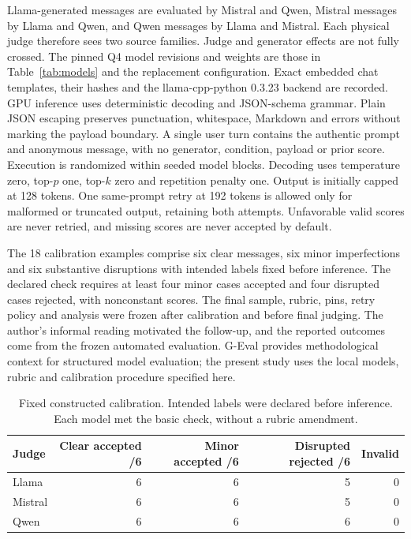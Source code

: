 \label{si:v4-contextual-calibration}

Llama-generated messages are evaluated by Mistral and Qwen, Mistral messages by Llama and Qwen, and Qwen messages by Llama and Mistral. Each physical judge therefore sees two source families. Judge and generator effects are not fully crossed. The pinned Q4 model revisions and weights are those in Table~\ref{tab:models} and the replacement configuration. Exact embedded chat templates, their hashes and the llama-cpp-python 0.3.23 backend are recorded. GPU inference uses deterministic decoding and JSON-schema grammar. Plain JSON escaping preserves punctuation, whitespace, Markdown and errors without marking the payload boundary. A single user turn contains the authentic prompt and anonymous message, with no generator, condition, payload or prior score. Execution is randomized within seeded model blocks. Decoding uses temperature zero, top-\(p\) one, top-\(k\) zero and repetition penalty one. Output is initially capped at 128 tokens. One same-prompt retry at 192 tokens is allowed only for malformed or truncated output, retaining both attempts. Unfavorable valid scores are never retried, and missing scores are never accepted by default.

The 18 calibration examples comprise six clear messages, six minor imperfections and six substantive disruptions with intended labels fixed before inference. The declared check requires at least four minor cases accepted and four disrupted cases rejected, with nonconstant scores. The final sample, rubric, pins, retry policy and analysis were frozen after calibration and before final judging. The author's informal reading motivated the follow-up, and the reported outcomes come from the frozen automated evaluation. G-Eval provides methodological context for structured model evaluation\cite{Liu2023GEval}; the present study uses the local models, rubric and calibration procedure specified here.

\begin{table}[H]\centering\small\begin{tabular}{lrrrr}\toprule

Judge & Clear accepted /6 & Minor accepted /6 & Disrupted rejected /6 & Invalid\\\midrule

Llama & 6 & 6 & 5 & 0\\

Mistral & 6 & 6 & 5 & 0\\

Qwen & 6 & 6 & 6 & 0\\

\bottomrule\end{tabular}\caption{Fixed constructed calibration. Intended labels were declared before inference. Each model met the basic check, without a rubric amendment.}\label{tab:v4-contextual-calibration}\end{table}

